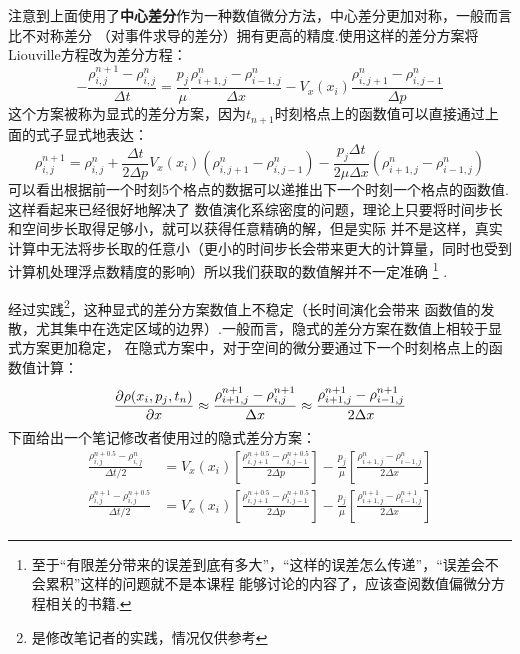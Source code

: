     注意到上面使用了\textbf{中心差分}作为一种数值微分方法，中心差分更加对称，一般而言比不对称差分
    （对事件求导的差分）拥有更高的精度.使用这样的差分方案将Liouville方程改为差分方程：
    \begin{equation}
        -\frac{\rho_{i, j}^{n+1} - \rho_{i, j}^{n}}{\Delta t} = \frac{p_j}{\mu}
        \frac{\rho_{i+1, j}^{n} - \rho_{i-1, j}^{n}}{\Delta x} - V_x(x_i)
        \frac{\rho_{i, j+1}^{n} - \rho_{i, j-1}^{n}}{\Delta p}
    \end{equation}
    这个方案被称为显式的差分方案，因为$t_{n+1}$时刻格点上的函数值可以直接通过上面的式子显式地表达：
    \begin{equation}
        \rho_{i, j}^{n+1} = \rho_{i, j}^{n} + \frac{\Delta t}{2\Delta p}V_{x}(x_i)(\rho_{i, j+1}^{n} - \rho_{i, j-1}^{n})
        - \frac{p_j\Delta t}{2 \mu \Delta x}(\rho_{i+1, j}^{n} - \rho_{i-1, j}^{n}) 
    \end{equation}
    可以看出根据前一个时刻5个格点的数据可以递推出下一个时刻一个格点的函数值.这样看起来已经很好地解决了
    数值演化系综密度的问题，理论上只要将时间步长和空间步长取得足够小，就可以获得任意精确的解，但是实际
    并不是这样，真实计算中无法将步长取的任意小（更小的时间步长会带来更大的计算量，同时也受到
    计算机处理浮点数精度的影响）所以我们获取的数值解并不一定准确
    \footnote{
        至于“有限差分带来的误差到底有多大”，“这样的误差怎么传递”，“误差会不会累积”这样的问题就不是本课程
        能够讨论的内容了，应该查阅数值偏微分方程相关的书籍.
    }
    .
    \par 
    经过实践\footnote{是修改笔记者的实践，情况仅供参考}，这种显式的差分方案数值上不稳定（长时间演化会带来
    函数值的发散，尤其集中在选定区域的边界）.一般而言，隐式的差分方案在数值上相较于显式方案更加稳定，
    在隐式方案中，对于空间的微分要通过下一个时刻格点上的函数值计算：
    \begin{equation}
        \frac{\partial{\rho(x_i, p_j, t_n)}}{\partial{x}} \approx \frac{\rho_{i + 1, j}^{n+1} - \rho_{i, j}^{n+1}}{\Delta x}
             \approx \frac{\rho_{i + 1, j}^{n+1} - \rho_{i-1, j}^{n+1}}{2\Delta x}
    \end{equation}
    下面给出一个笔记修改者使用过的隐式差分方案：
    \begin{equation}
        \begin{split}
            \frac{\rho_{i,j}^{n+0.5} - \rho_{i,j}^{n}}{\Delta t/2} &= V_{x}(x_{i})\left[\frac{\rho_{i,j+1}^{n+0.5} - 
            \rho_{i,j-1}^{n+0.5}}{2\Delta p}\right] - \frac{p_{j}}{\mu}\left[\frac{\rho_{i+1,j}^{n} - 
            \rho_{i-1,j}^{n}}{2\Delta x}\right]\\
            \frac{\rho_{i,j}^{n+1} - \rho_{i,j}^{n+0.5}}{\Delta t/2} &= V_{x}(x_{i})\left[\frac{\rho_{i,j+1}^{n+0.5} -
            \rho_{i,j-1}^{n+0.5}}{2\Delta p}\right] - \frac{p_{j}}{\mu}\left[\frac{\rho_{i+1,j}^{n+1} - 
            \rho_{i-1,j}^{n+1}}{2\Delta x}\right]
        \end{split}
    \end{equation}
